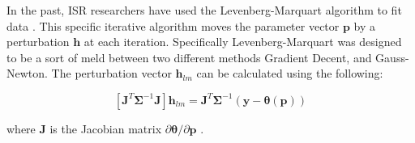 In the past, ISR researchers have used the Levenberg-Marquart algorithm to fit data \cite{nikoukar2008}. This specific iterative algorithm moves the parameter vector $\mathbf{p}$ by a perturbation $\mathbf{h}$ at each iteration\cite{gavin:2013}. Specifically Levenberg-Marquart was designed to be a sort of meld between two different methods Gradient Decent, and Gauss-Newton. The perturbation vector $\mathbf{h}_{lm}$ can be calculated using the following:

\begin{equation}
\left[ \mathbf{J}^T\bm{\Sigma}^{-1}\mathbf{J}\right]\mathbf{h}_{lm} =\mathbf{J}^T\bm{\Sigma}^{-1}(\mathbf{y}-\bm{\theta}(\mathbf{p}))
\label{hlm}
\end{equation}

\noindent where $\mathbf{J}$ is the Jacobian matrix $\partial \bm{\theta}/\partial \mathbf{p}$ \cite{levenberg1944,marquardt:1963}. 

%




